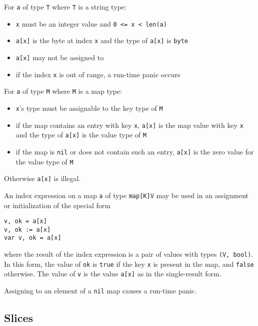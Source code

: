 For \texttt{a} of type \texttt{T} where \texttt{T} is a
string type:

\begin{itemize}
\item
  \texttt{x} must be an integer value and
  \texttt{0 \textless{}= x \textless{} len(a)}
\item
  \texttt{a{[}x{]}} is the byte at index \texttt{x} and the type of
  \texttt{a{[}x{]}} is \texttt{byte}
\item
  \texttt{a{[}x{]}} may not be assigned to
\item
  if the index \texttt{x} is out of range, a
  run-time panic occurs
\end{itemize}

For \texttt{a} of type \texttt{M} where \texttt{M} is a
map type:

\begin{itemize}
\item
  \texttt{x}'s type must be assignable to the
  key type of \texttt{M}
\item
  if the map contains an entry with key \texttt{x}, \texttt{a{[}x{]}} is
  the map value with key \texttt{x} and the type of \texttt{a{[}x{]}} is
  the value type of \texttt{M}
\item
  if the map is \texttt{nil} or does not contain such an entry,
  \texttt{a{[}x{]}} is the zero value for
  the value type of \texttt{M}
\end{itemize}

Otherwise \texttt{a{[}x{]}} is illegal.

An index expression on a map \texttt{a} of type \texttt{map{[}K{]}V} may
be used in an assignment or initialization of the special form

\begin{Verbatim}[frame=single]
v, ok = a[x]
v, ok := a[x]
var v, ok = a[x]
\end{Verbatim}

where the result of the index expression is a pair of values with types
\texttt{(V, bool)}. In this form, the value of \texttt{ok} is
\texttt{true} if the key \texttt{x} is present in the map, and
\texttt{false} otherwise. The value of \texttt{v} is the value
\texttt{a{[}x{]}} as in the single-result form.

Assigning to an element of a \texttt{nil} map causes a
run-time panic.

\subsection*{Slices}

